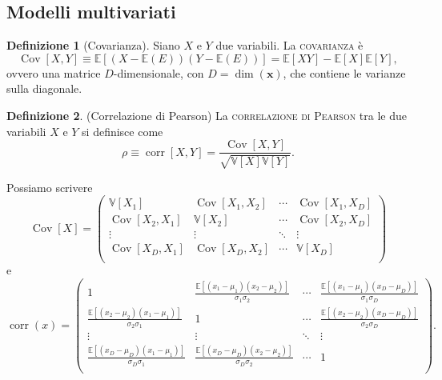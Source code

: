 \documentclass[10pt]{article}
\DeclareMathOperator{\Cov}{Cov}
\DeclareMathOperator{\corr}{corr}
\newcommand{\ve}[1]{\bm{#1}}
\newcommand{\im}[1]{\textsc{#1}}
\newcommand{\pare}[1]{
	\ensuremath{\left(#1\right)}
}
\newcommand{\spare}[1]{
	\ensuremath{\left[#1\right]}
}
\theoremstyle{definition}
\newtheorem{definition}{Definizione}[section]
\begin{document}
\subsection{Modelli multivariati}
\begin{definition}[Covarianza]
Siano $X$ e $Y$ due variabili. La \im{covarianza} è
\begin{equation}
\Cov\spare{X, Y} \equiv \mathbb{E}\spare{\pare{X - \mathbb{E}\pare{E}}\pare{Y - \mathbb{E}\pare{E}}} = \mathbb{E}\spare{XY} - \mathbb{E}\spare{X}\mathbb{E}\spare{Y},
\end{equation}
ovvero una matrice $D$-dimensionale, con $D = \dim\pare{\ve{x}}$, che contiene le varianze sulla diagonale.
\end{definition}

\begin{definition}(Correlazione di Pearson)
La \im{correlazione di Pearson} tra le due variabili $X$ e $Y$ si definisce come
\begin{equation}
\rho \equiv \corr\spare{X, Y} = \frac{\Cov\spare{X, Y}}{\sqrt{\mathbb{V}\spare{X}\mathbb{V}\spare{Y}}}.
\end{equation}
\end{definition}

Possiamo scrivere
\begin{equation}
\Cov\spare{X} = \pare{\begin{array}{cccc}
\mathbb{V}\spare{X_1} & \Cov\spare{X_1, X_2} & \cdots & \Cov\spare{X_1, X_D} \\
\Cov\spare{X_2, X_1} & \mathbb{V}\spare{X_2} & \cdots & \Cov\spare{X_2, X_D} \\
\vdots & \vdots & \ddots & \vdots \\
\Cov\spare{X_D, X_1} & \Cov\spare{X_D, X_2} & \cdots & \mathbb{V}\spare{X_D} \\
\end{array}}
\end{equation}
e
\begin{equation}
\corr\pare{x} = \pare{\begin{array}{cccc}
1 & \frac{\mathbb{E}\spare{\pare{x_1-\mu_1}\pare{x_2-\mu_2}}}{\sigma_1\sigma_2} & \cdots & \frac{\mathbb{E}\spare{\pare{x_1-\mu_1}\pare{x_D-\mu_D}}}{\sigma_1\sigma_D} \\
\frac{\mathbb{E}\spare{\pare{x_2-\mu_2}\pare{x_1-\mu_1}}}{\sigma_2\sigma_1} & 1 & \cdots & \frac{\mathbb{E}\spare{\pare{x_2-\mu_2}\pare{x_D-\mu_D}}}{\sigma_2\sigma_D} \\
\vdots & \vdots & \ddots & \vdots \\
\frac{\mathbb{E}\spare{\pare{x_D-\mu_D}\pare{x_1-\mu_1}}}{\sigma_D\sigma_1} & \frac{\mathbb{E}\spare{\pare{x_D-\mu_D}\pare{x_2-\mu_2}}}{\sigma_D\sigma_2} & \cdots & 1 \\
\end{array}}.
\end{equation}
\end{document}
